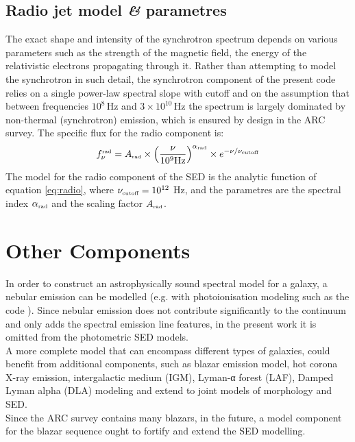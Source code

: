 \subsection{Radio jet model \textit{\&} parametres}
The exact shape and intensity of the synchrotron spectrum depends on various parameters such as the strength of the magnetic field, the energy of the relativistic electrons propagating through it. Rather than attempting to model the synchrotron in such detail, the synchrotron component of the present code relies on a single power-law spectral slope with cutoff and on the assumption that between frequencies $10^8\,\mbox{Hz}$ and $3\times 10^{10}\,\mbox{Hz}$ the spectrum is largely dominated by non-thermal (synchrotron) emission, which is ensured by design in the ARC survey. The specific flux for the radio component is: 
\begin{equation}
    f_{\nu}^{\mbox{\tiny{rad}}} = A_{\mbox{\tiny{rad}}}\times \Big( \dfrac{\nu}{10^9 \mbox{Hz}} \Big)^{\alpha_{\mbox{\tiny{rad}}}} \times e^{-\nu/\nu_{\text{\tiny{cutoff}}}} 
    \label{eq:radio}
\end{equation}
The model for the radio component of the SED is the analytic function of equation \ref{eq:radio}, where $\nu_{\text{\tiny{cutoff}}} = 10^{12}$ Hz,  and the parametres are the spectral index $\alpha_{\mbox{\tiny{rad}}}$ and the scaling factor $A_{\mbox{\tiny{rad}}}$.



\section{Other Components}\label{sec:blazar}
In order to construct an astrophysically sound spectral model for a galaxy, a nebular emission can be modelled (e.g. with photoionisation modeling such as the code \cite{CLOUDY}). Since nebular emission does not contribute significantly to the continuum and only adds the spectral emission line features, in the present work it is omitted from the photometric SED models.\\
A more complete model that can encompass different types of galaxies, could benefit from additional components, such as blazar emission model, hot corona X-ray emission, intergalactic medium (IGM), Lyman-α forest (LAF), Damped Lyman alpha (DLA) modeling and extend to joint models of morphology and SED. \\
Since the ARC survey contains many blazars, in the future, a model component for the blazar sequence ought to fortify and extend the SED modelling.

